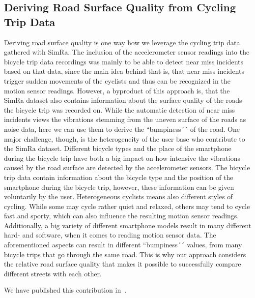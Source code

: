 \subsection{Deriving Road Surface Quality from Cycling Trip Data}
\label{subsec:road_surface_contribution}
Deriving road surface quality is one way how we leverage the cycling trip data gathered with SimRa.
The inclusion of the accelerometer sensor readings into the bicycle trip data recordings was mainly to be able to detect near miss incidents based on that data, since the main idea behind that is, that near miss incidents trigger sudden movements of the cyclists and thus can be recognized in the motion sensor readings.
However, a byproduct of this approach is, that the SimRa dataset also contains information about the surface quality of the roads the bicycle trip was recorded on.
While the automatic detection of near miss incidents views the vibrations stemming from the uneven surface of the roads as noise data, here we can use them to derive the ``bumpiness´´ of the road.
One major challenge, though, is the heterogeneity  of the user base who contribute to the SimRa dataset.
Different bicycle types and the place of the smartphone during the bicycle trip have both a big impact on how intensive the vibrations caused by the road surface are detected by the accelerometer sensors.
The bicycle trip data contain information about the bicycle type and the position of the smartphone during the bicycle trip, however, these information can be given voluntarily by the user.
Heterogeneous cyclists means also different styles of cycling.
While some may cycle rather quiet and relaxed, others may tend to cycle fast and sporty, which can also influence the resulting motion sensor readings.
Additionally, a big variety of different smartphone models result in many different hard- and software, when it comes to reading motion sensor data.
The aforementioned aspects can result in different ``bumpiness´´ values, from many bicycle trips that go through the same road.
This is why our approach considers the relative road surface quality that makes it possible to successfully compare different streets with each other.

We have published this contribution in~\cite{karakaya2023crowdsensing}.

